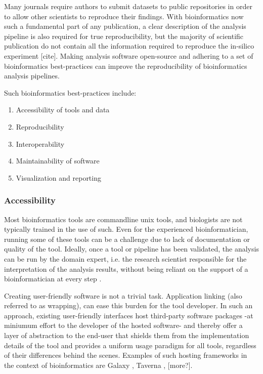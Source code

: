 Many journals require authors to submit datasets to public repositories in order to allow other scientists to reproduce their findings. With bioinformatics now such a fundamental part of any publication, a clear description of the analysis pipeline is also required for true reproducibility, but the majority of scientific publication do not contain all the information required to reproduce the in-silico experiment [cite]. Making analysis software open-source and adhering to a set of bioinformatics best-practices can improve the reproducibility of bioinformatics analysis pipelines.

Such bioinformatics best-practices include:

\begin{enumerate}
    \itemsep-0.5em
    \item Accessibility of tools and data %
    \item Reproducibility %
    \item Interoperability %
    \item Maintainability of software %
    \item Visualization and reporting
\end{enumerate}


\subsubsection{Accessibility}
Most bioinformatics tools are commandline unix tools, and biologists are not typically trained in the use of such. Even for the experienced bioinformatician, running some of these tools can be a challenge due to lack of documentation or quality of the tool. Ideally, once a tool or pipeline has been validated, the analysis can be run by the domain expert, i.e. the research scientist responsible for the interpretation of the analysis results, without being reliant on the support of a bioinformatician at every step \cite{kumar2007bioinformatics}.

Creating user-friendly software is not a trivial task. Application linking (also referred to as wrapping), can ease this burden for the tool developer. In such an approach, existing user-friendly interfaces host third-party software packages -at miniumum effort to the developer of the hosted software- and thereby offer a layer of abstraction to the end-user that shields them from the implementation details of the tool and provides a uniform usage paradigm for all tools, regardless of their differences behind the scenes. Examples of such hosting frameworks in the context of bioinformatics are Galaxy \cite{giardine2005galaxy,goecks2010galaxy}, Taverna \cite{}, [more?].

